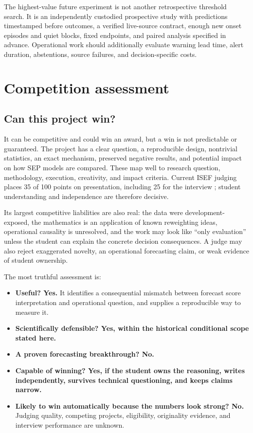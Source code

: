\documentclass[11pt]{article}
\begin{document}
The highest-value future experiment is not another retrospective threshold search. It is an independently custodied prospective study with predictions timestamped before outcomes, a verified live-source contract, enough new onset episodes and quiet blocks, fixed endpoints, and paired analysis specified in advance. Operational work should additionally evaluate warning lead time, alert duration, abstentions, source failures, and decision-specific costs.

\section{Competition assessment}

\subsection{Can this project win?}

It can be competitive and could win an award, but a win is not predictable or guaranteed. The project has a clear question, a reproducible design, nontrivial statistics, an exact mechanism, preserved negative results, and potential impact on how SEP models are compared. These map well to research question, methodology, execution, creativity, and impact criteria. Current ISEF judging places 35 of 100 points on presentation, including 25 for the interview \cite{isefcriteria2026}; student understanding and independence are therefore decisive.

Its largest competitive liabilities are also real: the data were development-exposed, the mathematics is an application of known reweighting ideas, operational causality is unresolved, and the work may look like ``only evaluation'' unless the student can explain the concrete decision consequences. A judge may also reject exaggerated novelty, an operational forecasting claim, or weak evidence of student ownership.

The most truthful assessment is:

\begin{itemize}
\item \textbf{Useful? Yes.} It identifies a consequential mismatch between forecast score interpretation and operational question, and supplies a reproducible way to measure it.
\item \textbf{Scientifically defensible? Yes, within the historical conditional scope stated here.}
\item \textbf{A proven forecasting breakthrough? No.}
\item \textbf{Capable of winning? Yes, if the student owns the reasoning, writes independently, survives technical questioning, and keeps claims narrow.}
\item \textbf{Likely to win automatically because the numbers look strong? No.} Judging quality, competing projects, eligibility, originality evidence, and interview performance are unknown.
\end{itemize}
\end{document}
